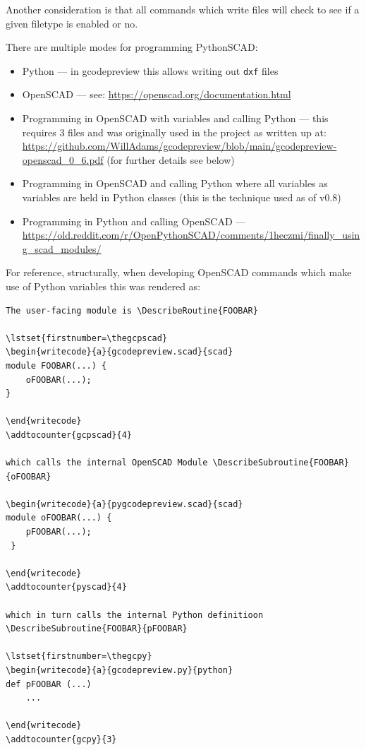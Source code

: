 \documentclass{ltxdoc}
\begin{document}
\addvspace{\baselineskip}


Another consideration is that all commands which write files will check to see if a given filetype is enabled or no.

There are multiple modes for programming PythonSCAD:

\begin{itemize}
\item Python --- in gcodepreview this allows writing out \verb|dxf| files
\item OpenSCAD --- see: \url{https://openscad.org/documentation.html}
\item Programming in OpenSCAD with variables and calling Python --- this requires 3 files and was originally used in the project as written up at: \url{https://github.com/WillAdams/gcodepreview/blob/main/gcodepreview-openscad_0_6.pdf} (for further details see below)
\item Programming in OpenSCAD and calling Python where all variables as variables are held in Python classes (this is the technique used as of v0.8)
\item Programming in Python and calling OpenSCAD --- \url{https://old.reddit.com/r/OpenPythonSCAD/comments/1heczmi/finally_using_scad_modules/}
\end{itemize}

For reference, structurally, when developing OpenSCAD commands which make use of Python variables this was rendered as:

\begin{verbatim}
The user-facing module is \DescribeRoutine{FOOBAR}

\lstset{firstnumber=\thegcpscad}
\begin{writecode}{a}{gcodepreview.scad}{scad}
module FOOBAR(...) {
    oFOOBAR(...);
}

\end{writecode}
\addtocounter{gcpscad}{4}
 
which calls the internal OpenSCAD Module \DescribeSubroutine{FOOBAR}{oFOOBAR}

\begin{writecode}{a}{pygcodepreview.scad}{scad}
module oFOOBAR(...) {
    pFOOBAR(...);
 }
 
\end{writecode}
\addtocounter{pyscad}{4}

which in turn calls the internal Python definitioon \DescribeSubroutine{FOOBAR}{pFOOBAR}

\lstset{firstnumber=\thegcpy}
\begin{writecode}{a}{gcodepreview.py}{python}
def pFOOBAR (...)
    ...
    
\end{writecode}
\addtocounter{gcpy}{3}
\end{verbatim}
\end{document}

